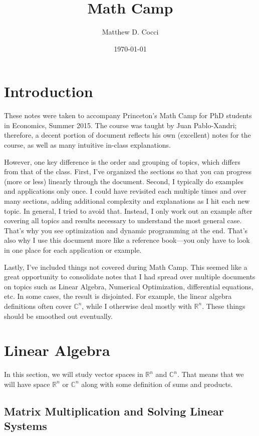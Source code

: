 \documentclass[12pt]{article}
\author{Matthew D. Cocci}
\title{Math Camp}
\date{\today}
\numberwithin{equation}{section} %
\theoremstyle{plain}
\theoremstyle{definition}
\theoremstyle{remark}
\newcommand{\Rn}{\mathbb{R}^n}
\newcommand{\Cn}{\mathbb{C}^n}
\begin{document}
\maketitle

\tableofcontents

\clearpage
\section{Introduction}

These notes were taken to accompany Princeton's Math Camp for PhD
students in Economics, Summer 2015. The course was taught by Juan
Pablo-Xandri; therefore, a decent portion of document reflects his own
(excellent) notes for the course, as well as many intuitive in-class
explanations.

However, one key difference is the order and grouping of topics, which
differs from that of the class. First, I've organized the sections so
that you can progress (more or less) linearly through the document.
Second, I typically do examples and applications only once. I could have
revisited each multiple times and over many sections, adding additional
complexity and explanations as I hit each new topic. In general, I tried
to avoid that. Instead, I only work out an example after covering all
topics and results necessary to understand the most general case.
That's why you see optimization and dynamic programming at the end.
That's also why I use this document more like a reference book---you
only have to look in one place for each application or example.

Lastly, I've included things not covered during Math Camp. This seemed
like a great opportunity to consolidate notes that I had spread over
multiple documents on topics such as Linear Algebra, Numerical
Optimization, differential equations, etc. In some cases, the result is
disjointed. For example, the linear algebra definitions often cover
$\Cn$, while I otherwise deal mostly with $\Rn$. These things should be
smoothed out eventually.

\clearpage
\section{Linear Algebra}

In this section, we will study vector spaces in $\Rn$ and $\Cn$.  That
means that we will have space $\Rn$ or $\Cn$ along with some definition
of sums and products.

\subsection{Matrix Multiplication and Solving Linear Systems}
\end{document}
